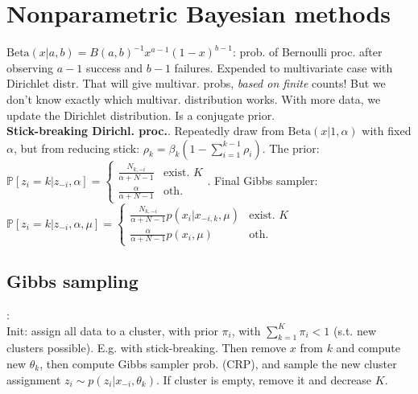 \section*{Nonparametric Bayesian methods}
$\text{Beta}(x|a,b)=B(a,b)^{-1} x^{a-1}(1-x)^{b-1}$: prob. of Bernoulli proc. after observing $a-1$ success and $b-1$ failures. Expended to multivariate case with Dirichlet distr. That will give multivar. probs, \textit{based on finite} counts! But we don't know exactly which multivar. distribution works. With more data, we update the Dirichlet distribution. Is a conjugate prior.\\
\textbf{Stick-breaking Dirichl. proc.}. Repeatedly draw from $\text{Beta}(x|1,\alpha)$ with fixed $\alpha$, but from reducing stick: $\rho_k=\beta_k(1-\sum_{i=1}^{k-1}\rho_i)$. The prior:\\
$\mathbb{P}[z_i=k|z_{-i},\alpha]=\begin{cases}\frac{N_{k,-i}}{\alpha+N-1} & \text{exist. }K \\ \frac{\alpha}{\alpha+N-1} & \text{oth.}\end{cases}$. Final Gibbs sampler:\\
$\mathbb{P}[z_i=k|z_{-i},\alpha,\mu]=\begin{cases}\frac{N_{k,-i}}{\alpha+N-1}p(x_i|x_{-i,k},\mu) & \text{exist. }K \\ \frac{\alpha}{\alpha+N-1}p(x_i,\mu) & \text{oth.}\end{cases}$

\subsection*{Gibbs sampling}:\\
Init: assign all data to a cluster, with prior $\pi_i$, with $\sum_{k=1}^K\pi_i<1$ (s.t. new clusters possible). E.g. with stick-breaking. Then remove $x$ from $k$ and compute new $\theta_k$, then compute Gibbs sampler prob. (CRP), and sample the new cluster assignment $z_i\sim p(z_i|x_{-i},\theta_k)$. If cluster is empty, remove it and decrease $K$.